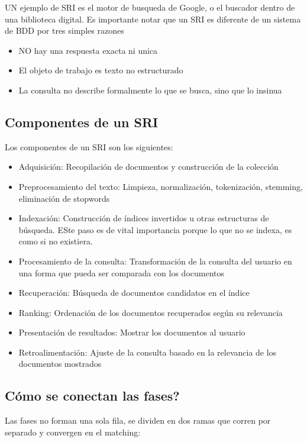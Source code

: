 \documentclass[11pt,letterpaper]{article}
\begin{document}
UN ejemplo de SRI es el motor de busqueda de Google, o el buscador dentro de una biblioteca digital.
Es importante notar que un SRI es diferente de un sistema de BDD por tres simples razones
\begin{itemize}
    \item NO hay una respuesta exacta ni unica
    \item El objeto de trabajo es texto no estructurado
    \item La consulta no describe formalmente lo que se busca, sino que lo insinua
\end{itemize}

\subsection*{Componentes de un SRI}

Los componentes de un SRI son los siguientes:
\begin{itemize}
    \item Adquisición: Recopilación de documentos y construcción de la colección
    \item Preprocesamiento del texto: Limpieza, normalización, tokenización, stemming, eliminación de stopwords
    \item Indexación: Construcción de índices invertidos u otras estructuras de búsqueda. ESte paso es de vital importancia porque lo que no se indexa, es como si no existiera.
    \item Procesamiento de la consulta: Transformación de la consulta del usuario en una forma que pueda ser comparada con los documentos
    \item Recuperación: Búsqueda de documentos candidatos en el índice
    \item Ranking: Ordenación de los documentos recuperados según su relevancia
    \item Presentación de resultados: Mostrar los documentos al usuario
    \item Retroalimentación: Ajuste de la consulta basado en la relevancia de los documentos mostrados
\end{itemize}

\subsection*{Cómo se conectan las fases?}

Las fases no forman una sola fila, se dividen en dos ramas que corren
por separado y convergen en el matching:
\end{document}
